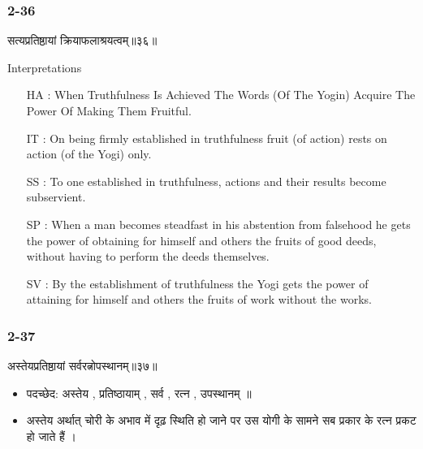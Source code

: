 \begin{frame}[fragile]\frametitle{2-36}
\begin{sanskrit}
सत्यप्रतिष्ठायां क्रियाफलाश्रयत्वम्॥३६॥
\end{sanskrit}

Interpretations
\begin{itemize}
\item [HA]: When Truthfulness Is Achieved The Words (Of The Yogin) Acquire The Power Of Making Them Fruitful.
\item [IT]: On being firmly established in truthfulness fruit (of action) rests on action (of the Yogi) only.
\item [SS]: To one established in truthfulness, actions and their results become subservient.
\item [SP]: When a man becomes steadfast in his abstention from falsehood he gets the power of obtaining for himself and others the fruits of good deeds, without having to perform the deeds themselves.
\item [SV]: By the establishment of truthfulness the Yogi gets the power of attaining for himself and others the fruits of work without the works. 
\end{itemize}
\end{frame}

\begin{frame}[fragile]\frametitle{2-37}
\begin{sanskrit}
अस्तेयप्रतिष्ठायां सर्वरत्नोपस्थानम्॥३७॥
\end{sanskrit}

\begin{itemize}
\item पदच्छेद: अस्तेय , प्रतिष्ठायाम् , सर्व , रत्न , उपस्थानम् ॥
\item अस्तेय अर्थात् चोरी के अभाव में दृढ़ स्थिति हो जाने पर उस योगी के सामने सब प्रकार के रत्न प्रकट हो जाते हैं ।
\end{itemize}	
	
\end{frame}


